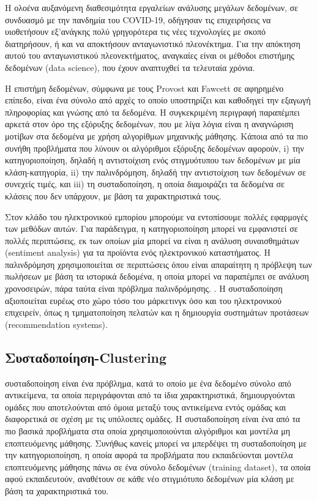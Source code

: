 \documentclass{article}
\begin{document}
Η ολοένα αυξανόμενη διαθεσιμότητα εργαλείων ανάλυσης μεγάλων δεδομένων, σε συνδυασμό με την πανδημία του COVID-19, οδήγησαν τις επιχειρήσεις να υιοθετήσουν εξ’ανάγκης πολύ γρηγορότερα τις νέες τεχνολογίες με σκοπό διατηρήσουν, ή και να αποκτήσουν ανταγωνιστικό πλεονέκτημα. \cite{fedirko2021data} Για την απόκτηση αυτού του ανταγωνιστικού πλεονεκτήματος, αναγκαίες είναι οι μέθοδοι επιστήμης δεδομένων (data science), που έχουν αναπτυχθεί τα τελευταία χρόνια.

Η επιστήμη δεδομένων, σύμφωνα με τους Provost και Fawcett σε αφηρημένο επίπεδο, είναι ένα σύνολο από αρχές το οποίο υποστηρίζει και καθοδηγεί την εξαγωγή πληροφορίας και γνώσης από τα δεδομένα. \cite{provost2013data} Η συγκεκριμένη περιγραφή παραπέμπει αρκετά στον όρο της εξόρυξης δεδομένων, που με λίγα λόγια είναι η αναγνώριση μοτίβων στα δεδομένα με χρήση αλγορίθμων μηχανικής μάθησης. \cite{fayyad1996kdd} Κάποια από τα πιο συνήθη προβλήματα που λύνουν οι αλγόριθμοι εξόρυξης δεδομένων αφορούν, i) την κατηγοριοποίηση, δηλαδή η αντιστοίχιση ενός στιγμυότυπου των δεδομένων με μία κλάση-κατηγορία, ii) την παλινδρόμηση, δηλαδή την αντιστοίχιση των δεδομένων σε συνεχείς τιμές, και iii) τη συσταδοποίηση, η οποία διαμοιράζει τα δεδομένα σε κλάσεις που δεν υπάρχουν, με βάση τα χαρακτηριστικά τους.

Στον κλάδο του ηλεκτρονικού εμπορίου μπορούμε να εντοπίσουμε πολλές εφαρμογές των μεθόδων αυτών. Για παράδειγμα, η κατηγοριοποίηση μπορεί να εμφανιστεί σε πολλές περιπτώσεις, εκ των οποίων μία μπορεί να είναι η ανάλυση συναισθημάτων (sentiment analysis) για τα προϊόντα ενός ηλεκτρονικού καταστήματος. \cite{xu2020commerce} Η παλινδρόμηση χρησιμοποιείται σε περιπτώσεις όπου είναι απαραίτητη η πρόβλεψη των πωλήσεων με βάση τα ιστορικά δεδομένα, η οποία μπορεί να παραπέμπει σε ανάλυση χρονοσειρών, πάρα ταύτα είναι πρόβλημα παλινδρόμησης. \cite{kohli2020sales}. Η συσταδοποίηση αξιοποιείται ευρέως στο χώρο τόσο του μάρκετινγκ όσο και του ηλεκτρονικού επιχειρείν, όπως η τμηματοποίηση πελατών \cite{kamthania2018market} και η δημιουργία συστημάτων προτάσεων (recommendation systems). \cite{bandyopadhyay2021product}

\subsection{Συσταδοποίηση-Clustering}

 συσταδοποίηση είναι ένα πρόβλημα, κατά το οποίο με ένα δεδομένο σύνολο από αντικείμενα, τα οποία περιγράφονται από τα ίδια χαρακτηριστικά, δημιουργούνται ομάδες που αποτελούνται από όμοια μεταξύ τους αντικείμενα εντός ομάδας και διαφορετικά σε σχέση με τις υπόλοιπες ομάδες. \cite{bonner1964some} Η συσταδοποίηση είναι ένα από τα πιο βασικά προβλήματα στα οποία χρησιμοποιούνται αλγόριθμοι και μοντέλα μη εποπτευόμενης μάθησης. \cite{popat2014review} Συνήθως κανείς μπορεί να μπερδέψει τη συσταδοποίηση με την κατηγοριοποίηση, η οποία αφορά τα προβλήματα που εκπαιδεύονται μοντέλα εποπτευόμενης μάθησης πάνω σε ένα σύνολο δεδομένων (training dataset), τα οποία αφού εκπαιδευτούν, αναθέτουν σε κάθε νέο στιγμιότυπο δεδομένων μία κλάση με βάση τα χαρακτηριστικά του. \cite{sen2020supervised}
\end{document}
